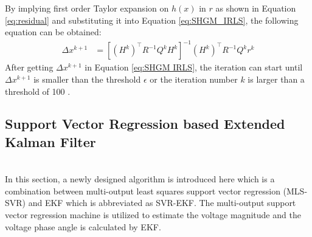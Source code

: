 By implying first order Taylor expansion on $h(x)$ in $r$ as shown in Equation \ref{eq:residual} and substituting it into Equation \ref{eq:SHGM_IRLS}, the following equation can be obtained:
\begin{align}
    \Delta x^{k+1} &= [(H^k)^{\intercal} R^{-1} Q^k H^k]^{-1} (H^k)^{\intercal} R^{-1} Q^k r^k
    \label{eq:SHGM IRLS}
\end{align}
After getting $\Delta x^{k+1}$ in Equation \ref{eq:SHGM IRLS}, the iteration can start until $\Delta x^{k+1}$ is smaller than the threshold $\epsilon$ or the iteration number $k$ is larger than a threshold of 100 \cite{mili1996robust}. 

\subsection{Support Vector Regression based Extended Kalman Filter}
\\In this section, a newly designed algorithm is introduced here which is a combination between multi-output least squares support vector regression (MLS-SVR) \cite{xu2013multi} and EKF which is abbreviated as SVR-EKF. The multi-output support vector regression machine is utilized to estimate the voltage magnitude and the voltage phase angle is calculated by EKF.

